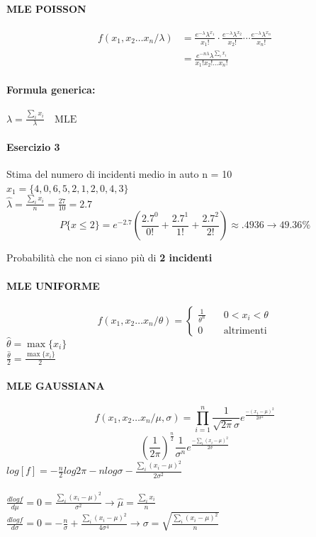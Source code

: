 \documentclass[]{article}
\newcommand{\formula}{\paragraph{Formula generica:}}
\begin{document}
    \paragraph{MLE POISSON}
    \begin{equation*}
        \begin{split}
            f(x_1, x_2 \ldots x_n / \lambda) &= \frac{e^{-\lambda} \lambda^{x_1}}{x_1 !} \cdot \frac{e^{-\lambda} \lambda^{x_2}}{x_2 !} \cdots \frac{e^{-\lambda} \lambda^{x_n}}{x_n !} \\
            &= \frac{e^{-n\lambda} \lambda^{\sum_{i}^{} x_i}}{x_1! x_2! \ldots x_n!}
        \end{split}
    \end{equation*}
    \formula
    $\lambda = \frac{\sum_{i}^{} x_i}{\lambda} \quad \text{MLE} $
    \paragraph{Esercizio 3} Stima del numero di incidenti medio in auto n = 10 \\
    $x_1 = \{ 4,0,6,5,2,1,2,0,4,3 \}$ \\
    $\hat{\lambda} = \frac{\sum_{i}^{} x_i}{n} = \frac{27}{10} = 2.7$
    \[ P\{x \leq 2 \} = e^{-2.7} (\frac{2.7^0}{0!} + \frac{2.7^1}{1!} + \frac{2.7^2}{2!}) \approx .4936 \rightarrow 49.36\% \]
    \centerline{Probabilità che non ci siano più di \textbf{2 incidenti} }
    \paragraph{MLE UNIFORME}
    \begin{equation*}
        f(x_1, x_2 \ldots x_n / \theta) =
        \begin{cases}
                \frac{1}{\theta^n} & \quad 0 < x_i < \theta \\
                0 & \quad \text{altrimenti}
        \end{cases}
    \end{equation*}
    $\hat{\theta} = \max\{x_i\}$ \\
    $\frac{\hat{\theta}}{2} = \frac{\max\{ x_i\}}{2}$
    \paragraph{MLE GAUSSIANA}
    \[ f(x_1,x_2 \ldots x_n / \mu, \sigma) = \prod_{i=1}^{n} \frac{1}{\sqrt{2\pi} \sigma} e^{\frac{-(x_1 - \mu)^2}{2 \sigma^2}} \]
    \[ (\frac{1}{2 \pi})^{\frac{n}{2}} \frac{1}{\sigma^n} e^{\frac{-\sum_{i}^{}(x_i - \mu)^2}{2 \sigma}} \]
    $log[f] = - \frac{n}{2} log 2\pi - n log \sigma - \frac{\sum_{i}^{}(x_i - \mu)^2}{2\sigma^2}$ \\ \\
    $\frac{d log f}{d \mu} = 0 = \frac{\sum_{i}^{}(x_i - \mu)^2}{\sigma^2} \longrightarrow \hat{\mu} = \frac{\sum_{i}^{}x_i}{n}$ \\
    $\frac{d log f}{d \sigma} = 0 = - \frac{n}{\sigma} + \frac{\sum_{i}^{} (x_i - \mu)^2}{4 \sigma^4} \rightarrow \sigma = \sqrt{\frac{\sum_{i}^{}(x_i - \mu)^2}{n}}$
\end{document}

